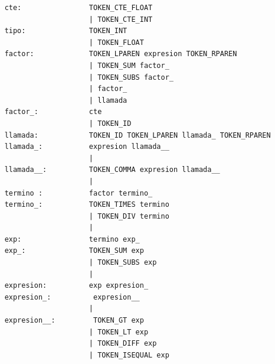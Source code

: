 \documentclass[12pt, letterpaper]{article}
\theoremstyle{definition}
\begin{document}
\begin{verbatim}
    cte:                TOKEN_CTE_FLOAT
                        | TOKEN_CTE_INT
    tipo:               TOKEN_INT
                        | TOKEN_FLOAT
    factor:             TOKEN_LPAREN expresion TOKEN_RPAREN
                        | TOKEN_SUM factor_
                        | TOKEN_SUBS factor_
                        | factor_
                        | llamada
    factor_:            cte
                        | TOKEN_ID
    llamada:            TOKEN_ID TOKEN_LPAREN llamada_ TOKEN_RPAREN
    llamada_:           expresion llamada__
                        | 
    llamada__:          TOKEN_COMMA expresion llamada__
                        | 
    termino :           factor termino_
    termino_:           TOKEN_TIMES termino
                        | TOKEN_DIV termino
                        |   
    exp:                termino exp_
    exp_:               TOKEN_SUM exp
                        | TOKEN_SUBS exp
                        | 
    expresion:          exp expresion_
    expresion_:          expresion__
                        | 
    expresion__:         TOKEN_GT exp
                        | TOKEN_LT exp
                        | TOKEN_DIFF exp
                        | TOKEN_ISEQUAL exp


\end{verbatim}
\end{document}
